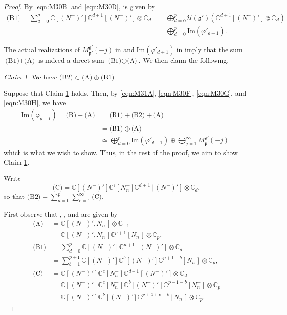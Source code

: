 \documentclass[reqno,11pt]{amsart}
\theoremstyle{remark}
\newtheorem{claim}[equation]{Claim}
\theoremstyle{definition}
\numberwithin{equation}{section}
\newcommand{\fg}{{\mathfrak g}}
\newcommand{\fp}{{\mathfrak p}}
\newcommand{\C}{\mathbb{C}}
\newcommand{\Cal}{\mathcal}
\renewcommand{\Im}{\mathrm{Im}}
\newcommand{\Mpp}{M^{\fg'}_{\fp'}}
\newcommand{\Np}{(N^-)'}
\newcommand{\Nn}{N_n^-}
\begin{document}
\begin{proof}
\noindent
By \eqref{eqn:M30B} and \eqref{eqn:M30D},   is given by
\begin{align}
\text{(B1)}
=\sum_{d=0}^p\C[\Np]\C^{d+1}[\Np]\otimes \C_d
&=\bigoplus_{d=0}^p\Cal{U}(\fg')\left(\C^{d+1}[\Np]\otimes \C_d\right)\nonumber \\
&=\bigoplus_{d=0}^p \Im(\varphi'_{d+1}).\label{eqn:M30H}
\end{align}

The actual realizations of $\Mpp(-j)$ in  and $\Im(\varphi'_{d+1})$ in 
imply that 
the sum $\text{(B1)} + \text{(A)}$ is indeed a direct sum
$\text{(B1)} \oplus \text{(A)}$.
We then claim the following.

\begin{claim}\label{claim:M30}
We have $\text{(B2)} \subset \text{(A)} \oplus \text{(B1)}$.
\end{claim}

Suppose that Claim \ref{claim:M30} holds. Then, 
by \eqref{eqn:M31A}, \eqref{eqn:M30F}, \eqref{eqn:M30G}, and \eqref{eqn:M30H},
we have 
\begin{align*}
\Im(\varphi_{p+1}) 
= \text{(B)}+\text{(A)}
&=\text{(B1)} + \text{(B2)} + \text{(A)}\\
&= \text{(B1)}\oplus \text{(A)}\\
&\simeq 
\bigoplus_{d=0}^p \Im(\varphi'_{d+1}) \oplus \bigoplus_{j=1}^\infty\Mpp(-j),
\end{align*}
which is what we wish to show. Thus, in the rest of the proof, we aim to show 
Claim \ref{claim:M30}.

Write
\begin{equation*}
\text{(C)}=\C[\Np]\C^c[\Nn]\C^{d+1}[\Np]\otimes \C_d,
\end{equation*}
so that 
$\text{(B2)} = \sum_{d=0}^p\sum_{c=1}^\infty \text{(C)}$.

First observe that , , and  are given by
\begin{align*}
\text{(A)}
&= \C[\Np,\Nn]\otimes \C_{-1}\\
&=\C[\Np,\Nn]\C^{p+1}[\Nn]\otimes \C_p,\\[7pt]
\text{(B1)}
&=\sum_{d=0}^p\C[\Np]\C^{d+1}[\Np]\otimes \C_d\\
&=\sum_{b=1}^{p+1}\C[\Np]\C^{b}[\Np]\C^{p+1-b}[\Nn]\otimes \C_p, \\[7pt]
\text{(C)}
&= \C[\Np]\C^c[\Nn]\C^{d+1}[\Np]\otimes \C_d\\
&= \C[\Np]\C^c[\Nn]\C^{b}[\Np]\C^{p+1-b}[\Nn]\otimes \C_p\\
&= \C[\Np]\C^{b}[\Np]\C^{p+1+c-b}[\Nn]\otimes \C_p.
\end{align*}


\end{proof}
\end{document}
